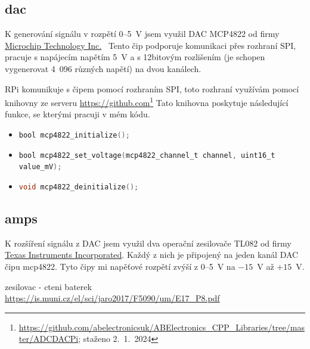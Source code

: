 \subsection{dac}
K generování signálu v rozpětí 0--5~V jsem využil DAC MCP4822 od firmy \href{https://www.microchip.com}{Microchip Technology Inc.}\ 
Tento čip podporuje komunikaci přes rozhraní SPI, pracuje s napájecím napětím 5~V a s 12bitovým rozlišením (je schopen vygenerovat 4~096 různých napětí) na dvou kanálech.

RPi komunikuje s čipem pomocí rozhraním SPI, toto rozhraní využívám pomocí knihovny ze serveru \url{https://github.com}\footnote{\url{https://github.com/abelectronicsuk/ABElectronics_CPP_Libraries/tree/master/ADCDACPi}; staženo 2.~1.~2024} 
Tato knihovna poskytuje následující funkce, se kterými pracuji v mém kódu.
\begin{itemize}
\item
\lstinline[language=C]!bool mcp4822_initialize();!
\item
\lstinline[language=C]!bool mcp4822_set_voltage(mcp4822_channel_t channel, uint16_t value_mV);!
\item
\lstinline[language=C]!void mcp4822_deinitialize();!
\end{itemize}
\subsection{amps}
K rozšíření signálu z DAC jsem využil dva operační zesilovače TL082 od firmy \href{https://www.ti.com/}{Texas Instruments Incorporated}. Každý z nich je připojený na jeden kanál DAC čipu mcp4822.
Tyto čipy mi napěťové rozpětí zvýší z 0--5~V na $-15$~V až $+15$~V.

zesilovac - cteni baterek \url{https://is.muni.cz/el/sci/jaro2017/F5090/um/E17_P8.pdf}
